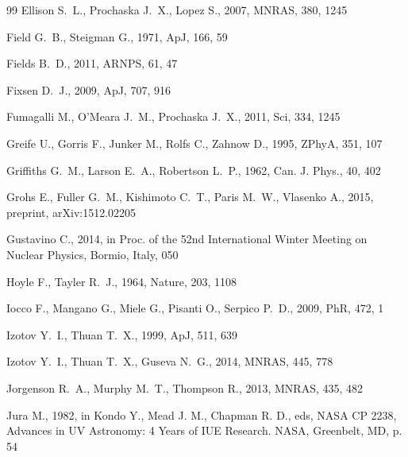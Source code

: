 \documentclass[12pt,preprint,useAMS,usenatbib]{emulateapj}
\begin{document}
\begin{thebibliography}{99}
Ellison S.~L., Prochaska J.~X., Lopez S., 2007, MNRAS, 380, 1245

Field G.~B., Steigman G., 1971, ApJ, 166, 59

Fields B.~D., 2011, ARNPS, 61, 47

Fixsen D.~J., 2009, ApJ, 707, 916

Fumagalli M., O'Meara J.~M., Prochaska J.~X., 2011, Sci, 334, 1245

Greife U., Gorris F., Junker M., Rolfs C., Zahnow D., 1995, ZPhyA, 351, 107

Griffiths G.~M., Larson E.~A., Robertson L.~P., 1962, Can. J. Phys., 40, 402

Grohs E., Fuller G.~M., Kishimoto C.~T., Paris M.~W., Vlasenko A., 2015, preprint, arXiv:1512.02205

Gustavino C., 2014, in Proc. of the 52nd International Winter Meeting on Nuclear Physics, Bormio, Italy, 050

Hoyle F., Tayler R.~J., 1964, Nature, 203, 1108

Iocco F., Mangano G., Miele G., Pisanti O., Serpico P.~D., 2009, PhR, 472, 1

Izotov Y.~I., Thuan T.~X., 1999, ApJ, 511, 639

Izotov Y.~I., Thuan T.~X., Guseva N.~G., 2014, MNRAS, 445, 778

Jorgenson R.~A., Murphy M.~T., Thompson R., 2013, MNRAS, 435, 482

Jura M., 1982, in Kondo Y., Mead J. M., Chapman R. D., eds, NASA CP 2238, Advances in UV Astronomy: 4 Years of IUE Research. NASA, Greenbelt, MD, p. 54


\end{thebibliography}
\end{document}
